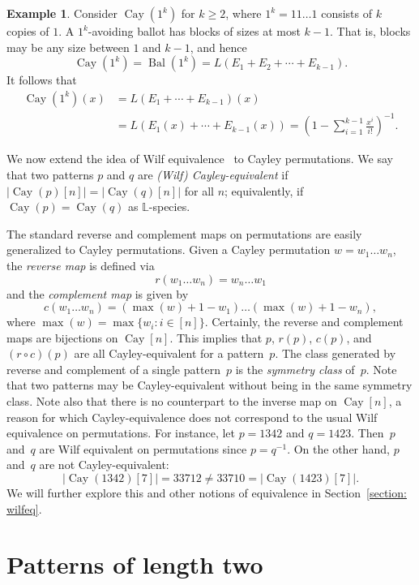 \documentclass[a4paper, 11pt]{article}
\DeclareMathOperator{\Bal}{Bal}
\DeclareMathOperator{\Cay}{Cay}
\newcommand{\LL}{\mathbb{L}}
\theoremstyle{definition}
\newtheorem{example}[theorem]{Example}
\begin{document}
\begin{example}\label{ex:1^k}
Consider $\Cay(1^k)$ for $k\geq 2$, where 
$1^k = 11 \ldots 1$ consists of $k$ copies of $1$.
A $1^k$-avoiding ballot has blocks of sizes at most $k-1$. That is,
blocks may be any size between $1$ and $k-1$, and hence
\[
  \Cay(1^k)=\Bal(1^k) = L(E_1 + E_2 + \cdots + E_{k-1}).
\]
It follows that
\begin{align*}
\Cay(1^k)(x)
  &= L(E_1 + \cdots + E_{k-1})(x) \\
  &= L(E_1(x) + \cdots + E_{k-1}(x))
  = \left(1 - \sum_{i=1}^{k-1} \frac{x^i}{i!}\right)^{-1}.
\end{align*}
\end{example}

We now extend the idea of Wilf equivalence~\cite{permpatternsbasicdefinitions}
to Cayley permutations.
We say that two patterns $p$ and $q$ are \emph{(Wilf) Cayley-equivalent}
if $|\Cay(p)[n]|=|\Cay(q)[n]|$ for all $n$; equivalently, if
$\Cay(p)=\Cay(q)$ as $\LL$-species.

The standard reverse and complement maps on permutations are easily generalized to
Cayley permutations.
Given a Cayley permutation $w=w_1\ldots w_n$, the \emph{reverse map}
is defined via
\[
r(w_1\ldots w_n) = w_n\ldots w_1
\]
and the \emph{complement map} is given by
\[
c(w_1 \ldots w_n) = (\max(w)+1-w_1)\ldots (\max(w)+1-w_n),
\]
where $\max(w) = \max\{w_i: i\in[n]\}$.
Certainly, the reverse and complement maps are bijections on $\Cay[n]$.
This implies that $p$, $r(p)$, $c(p)$, and $(r\circ c)(p)$ are all
Cayley-equivalent for a pattern~$p$. 
The class generated by reverse
and complement of a single pattern~$p$ is the \emph{symmetry class} of~$p$.
Note that two patterns may be Cayley-equivalent without being in the
same symmetry class.
Note also that there is no counterpart to the inverse map on $\Cay[n]$,
a reason for which Cayley-equivalence does not correspond to the
usual Wilf equivalence on permutations.
For instance, let $p=1342$ and $q=1423$. Then~$p$ and~$q$
are Wilf equivalent on permutations since $p=q^{-1}$.
On the other hand, $p$ and~$q$ are not Cayley-equivalent:
$$
|\Cay(1342)[7]|=33712\neq 33710=|\Cay(1423)[7]|.
$$
We will further explore this and other notions of equivalence
in Section~\ref{section: wilfeq}.

\section{Patterns of length two}\label{sec: length two}
\end{document}
